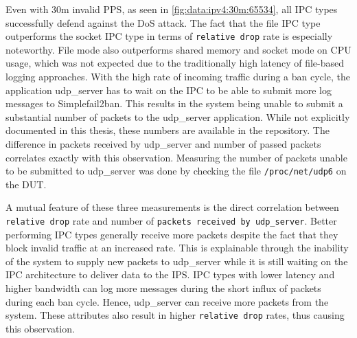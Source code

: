 Even with 30m invalid \ac{PPS}, as seen in \ref{fig:data:ipv4:30m:65534}, all \ac{IPC} types successfully defend against the \ac{DoS} attack.
The fact that the file \ac{IPC} type outperforms the socket \ac{IPC} type in terms of \texttt{relative drop} rate is especially noteworthy.
File mode also outperforms shared memory and socket mode on \ac{CPU} usage, which was not expected due to the traditionally high latency of file-based logging approaches.
With the high rate of incoming traffic during a ban cycle, the application udp\_server has to wait on the \ac{IPC} to be able to submit more log messages to Simplefail2ban.
This results in the system being unable to submit a substantial number of packets to the udp\_server application.
While not explicitly documented in this thesis, these numbers are available in the repository\cite{git:repoOfThesis}.
The difference in packets received by udp\_server and number of passed packets correlates exactly with this observation.
Measuring the number of packets unable to be submitted to udp\_server was done by checking the file \texttt{/proc/net/udp6} on the \ac{DUT}.

A mutual feature of these three measurements is the direct correlation between \texttt{relative drop} rate and number of \texttt{packets received by udp\_server}.
Better performing \ac{IPC} types generally receive more packets despite the fact that they block invalid traffic at an increased rate.
This is explainable through the inability of the system to supply new packets to udp\_server while it is still waiting on the \ac{IPC} architecture to deliver data to the \ac{IPS}.
\ac{IPC} types with lower latency and higher bandwidth can log more messages during the short influx of packets during each ban cycle.
Hence, udp\_server can receive more packets from the system.
These attributes also result in higher \texttt{relative drop} rates, thus causing this observation.

